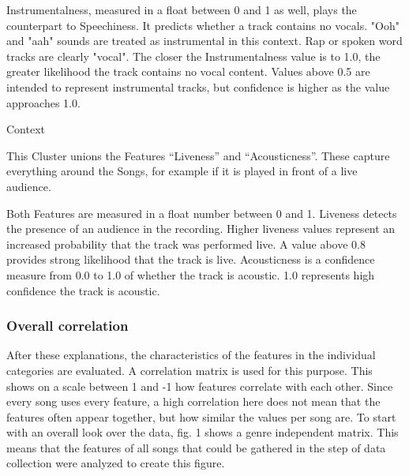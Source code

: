 Instrumentalness, measured in a float between 0 and 1 as well, plays the counterpart to Speechiness.
It predicts whether a track contains no vocals. 
"Ooh" and "aah" sounds are treated as instrumental in this context.
Rap or spoken word tracks are clearly "vocal". 
The closer the Instrumentalness value is to 1.0, the greater likelihood the track contains no vocal content. 
Values above 0.5 are intended to represent instrumental tracks,
but confidence is higher as the value approaches 1.0.

Context

This Cluster unions the Features “Liveness” and “Acousticness”.
These capture everything around the Songs, for example if it is played in front of a live audience.

Both Features are measured in a float number between 0 and 1.
Liveness detects the presence of an audience in the recording. 
Higher liveness values represent an increased probability that the track was performed live.
A value above 0.8 provides strong likelihood that the track is live. 
Acousticness is a confidence measure from 0.0 to 1.0 of whether the track is acoustic.
1.0 represents high confidence the track is acoustic. 

\subsubsection{Overall correlation}
After these explanations, the characteristics of the features in the individual categories are evaluated.
A correlation matrix is used for this purpose. This shows on a scale between 1 and -1 how
features correlate with each other. Since every song uses every feature,
a high correlation here does not mean that the features often appear together,
but how similar the values per song are. To start with an overall look over the data,
fig. 1  shows a genre independent matrix.
This means that the features of all songs that could be gathered in the step of data
collection were analyzed to create this figure. 

